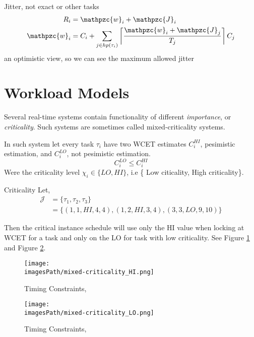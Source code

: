 Jitter, not exact or other tasks
\begin{align*}
  R_i &= \mathpzc{w}_i + \mathpzc{J}_i \\
  \mathpzc{w}_i &= C_i + \sum_{j \in hp(\tau_i)} \left\lceil\frac{\mathpzc{w}_i + \mathpzc{J}_j}{T_j}\right\rceil C_j \\
\end{align*}
an optimistic view, so we can see the maximum allowed jitter



\section{Workload Models}
Several real-time systems contain functionality of different 
\textit{importance}, or \textit{criticality}. 
Such systems are sometimes called mixed-criticality systems.

In such system let every task $\tau_i$ have two WCET estimates
$C_i^{HI}$, pesimistic estimation, and $C_i^{LO}$, not pesimistic estimation. 
\begin{equation}
  C_i^{LO} \leq C_i^{HI} 
\end{equation}
Were the criticality level $\chi_i\in\{LO, HI\}$, i.e \{ Low citicality, High criticality\}.


\begin{exampleblock}{Criticality}
  Let,
  \begin{align*}
    \mathcal{J} &= \{\tau_1, \tau_2, \tau_3\} \\
    &= \{ (1,1,HI,4,4), (1,2,HI,3,4), (3,3,LO,9,10) \}
  \end{align*}

  Then the critical instance schedule will use only the HI value 
  when locking at WCET for a task and only on the LO for task with 
  low criticality. See Figure \ref{fig:mixed-criticality_HI} and Figure 
  \ref{fig:mixed-criticality_LO}.
\end{exampleblock}

\begin{figure}[H]
    \centering
    \texttt{[image: \\imagesPath/mixed-criticality\_HI.png]}
    \caption{Timing Constraints, \cite{08A-advanced-workload-model, p.11}}
    \label{fig:mixed-criticality_HI}
\end{figure}

\begin{figure}[H]
    \centering
    \texttt{[image: \\imagesPath/mixed-criticality\_LO.png]}
    \caption{Timing Constraints, \cite{08A-advanced-workload-model, p.11}}
    \label{fig:mixed-criticality_LO}
\end{figure}

